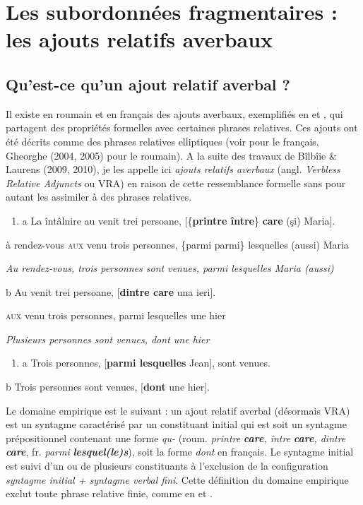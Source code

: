 
\section{Les subordonnées fragmentaires : les ajouts relatifs averbaux}
\subsection{Qu'est-ce qu'un ajout relatif averbal ?}
Il existe en roumain et en français des ajouts averbaux, exemplifiés en  et , qui partagent des propriétés formelles avec certaines phrases relatives. Ces ajouts ont été décrits comme des phrases relatives elliptiques (voir \citet{Grevisse1993} pour le français, Gheorghe (2004, 2005) pour le roumain). A la suite des travaux de Bîlbîie \& Laurens (2009, 2010), je les appelle ici \textit{ajouts relatifs averbaux} (angl. \textit{Verbless Relative Adjuncts} ou VRA) en raison de cette ressemblance formelle sans pour autant les assimiler à des phrases relatives.  


\begin{enumerate}
\item \label{bkm:Ref292713923}a  La întâlnire au venit trei persoane, [\{\textbf{printre {\textbar} între}\} \textbf{care} (şi) Maria]. 


\end{enumerate}
  à rendez-vous\textsc{ aux} venu trois personnes, \{parmi {\textbar} parmi\} lesquelles (aussi) Maria

  \textit{Au rendez-vous, trois personnes sont venues, parmi lesquelles Maria (aussi)}

  b  Au venit trei persoane, [\textbf{dintre care} una ieri].

    \textsc{aux} venu trois personnes, parmi lesquelles une hier

    \textit{Plusieurs personnes sont venues, dont une hier}


\begin{enumerate}
\item \label{bkm:Ref292713928}a  Trois personnes, [\textbf{parmi lesquelles} Jean], sont venues.


\end{enumerate}
  b  Trois personnes sont venues, [\textbf{dont} une hier].

Le domaine empirique est le suivant : un ajout relatif averbal (désormais VRA) est un syntagme caractérisé par un constituant initial qui est soit un syntagme prépositionnel contenant une forme \textit{qu-} (roum.\textit{ printre} \textbf{\textit{care}}\textit{, între} \textbf{\textit{care}}\textit{, dintre} \textbf{\textit{care}}, fr. \textit{parmi} \textbf{\textit{lesquel(le)s}}), soit la forme \textit{dont} en français. Le syntagme initial est suivi d'un ou de plusieurs constituants à l'exclusion de la configuration \textit{syntagme initial + syntagme verbal fini}. Cette définition du domaine empirique exclut toute phrase relative finie, comme en  et .


